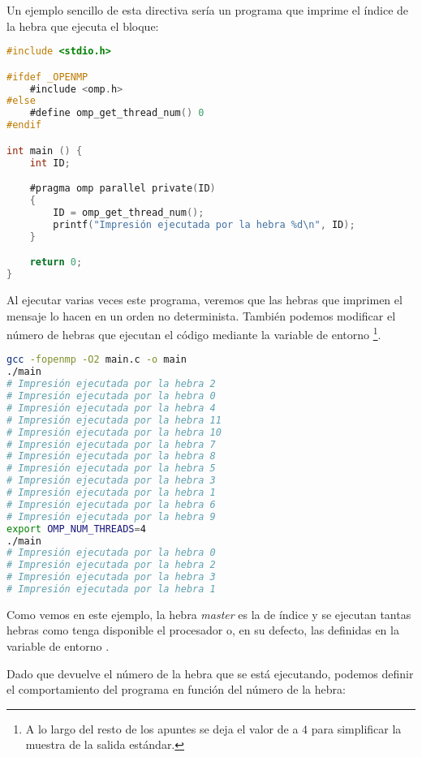Un ejemplo sencillo de esta directiva sería un programa que imprime el índice de la hebra que ejecuta el bloque:

\begin{lstlisting}[language=C]
#include <stdio.h>

#ifdef _OPENMP
	#include <omp.h>
#else
	#define omp_get_thread_num() 0
#endif

int main () {
	int ID;

	#pragma omp parallel private(ID)
	{
		ID = omp_get_thread_num();
		printf("Impresión ejecutada por la hebra %d\n", ID);
	}

	return 0;
}
\end{lstlisting}

Al ejecutar varias veces este programa, veremos que las hebras que imprimen el mensaje lo hacen en un orden no determinista.
También podemos modificar el número de hebras que ejecutan el código mediante la variable de entorno \footnote{%
	A lo largo del resto de los apuntes se deja el valor de  a $4$ para simplificar la muestra de la salida estándar.
}.

\begin{lstlisting}[language=sh]
gcc -fopenmp -O2 main.c -o main
./main
# Impresión ejecutada por la hebra 2
# Impresión ejecutada por la hebra 0
# Impresión ejecutada por la hebra 4
# Impresión ejecutada por la hebra 11
# Impresión ejecutada por la hebra 10
# Impresión ejecutada por la hebra 7
# Impresión ejecutada por la hebra 8
# Impresión ejecutada por la hebra 5
# Impresión ejecutada por la hebra 3
# Impresión ejecutada por la hebra 1
# Impresión ejecutada por la hebra 6
# Impresión ejecutada por la hebra 9
export OMP_NUM_THREADS=4
./main
# Impresión ejecutada por la hebra 0
# Impresión ejecutada por la hebra 2
# Impresión ejecutada por la hebra 3
# Impresión ejecutada por la hebra 1
\end{lstlisting}

Como vemos en este ejemplo, la hebra \textit{master} es la de índice  y se ejecutan tantas hebras como tenga disponible el procesador o, en su defecto, las definidas en la variable de entorno .

Dado que  devuelve el número de la hebra que se está ejecutando, podemos definir el comportamiento del programa en función del número de la hebra:

